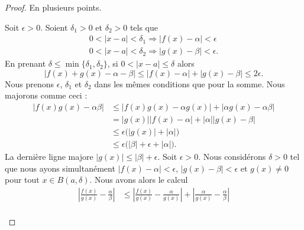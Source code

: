 \begin{proof}
	En plusieurs points.
	\begin{subproof}
		\spitem[La somme]
		Soit \( \epsilon>0\). Soient \( \delta_1>0\) et \( \delta_2>0\) tels que
		\begin{subequations}
			\begin{align}
				0<| x-a |<\delta_1\Rightarrow | f(x)-\alpha |<\epsilon \\
				0<| x-a |<\delta_2\Rightarrow | g(x)-\beta |<\epsilon.
			\end{align}
		\end{subequations}
		En prenant \( \delta\leq \min\{ \delta_1,\delta_2 \}\), si \( 0<| x-a |\leq \delta\) alors
		\begin{equation}
			| f(x)+g(x)-\alpha-\beta |\leq | f(x)-\alpha |+| g(x)-\beta |\leq 2\epsilon.
		\end{equation}
		\spitem[Le produit]
		Nous prenons \( \epsilon\), \( \delta_1\) et \( \delta_2\) dans les mêmes conditions que pour la somme. Nous majorons comme ceci :
		\begin{subequations}
			\begin{align}
				| f(x)g(x)-\alpha\beta | & \leq | f(x)g(x)-\alpha g(x) |+| \alpha g(x)-\alpha\beta | \\
				                         & =| g(x) | |f(x)-\alpha |+| \alpha | |g(x)-\beta |         \\
				                         & \leq   \epsilon\big(  | g(x) |  +| \alpha |   \big)       \\
				                         & \leq \epsilon\big( | \beta |+\epsilon+| \alpha | \big).
			\end{align}
		\end{subequations}
		La dernière ligne majore \( | g(x) |\leq | \beta |+\epsilon\).
		\spitem[Le quotient]
		Soit \( \epsilon>0\). Nous considérons \( \delta>0\) tel que nous ayons simultanément \( | f(x)-\alpha |<\epsilon\), \( | g(x)-\beta |<\epsilon\) et \( g(x)\neq 0\) pour tout \( x\in B(a,\delta)\). Nous avons alors le calcul
		\begin{subequations}
			\begin{align}
				| \frac{ f(x) }{ g(x) }-\frac{ \alpha }{ \beta } | & \leq | \frac{ f(x) }{ g(x) }-\frac{ \alpha }{ g(x) } |+| \frac{ \alpha }{ g(x) }-\frac{ \alpha }{ \beta } |            \\

\end{align}
\end{subequations}
\end{subproof}
\end{proof}
